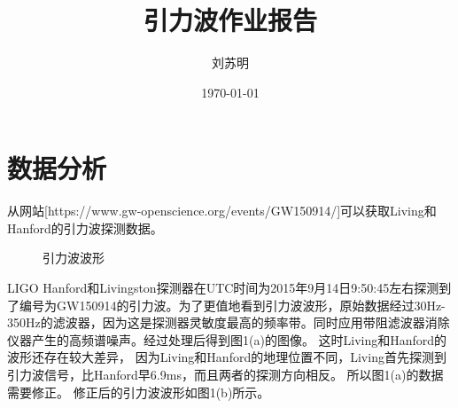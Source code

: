\documentclass[UTF8]{ctexart}
\title{\heiti 引力波作业报告}
\author{\kaishu 刘苏明}
\date{\today}
\begin{document}
\maketitle
\section{数据分析}
从网站[https://www.gw-openscience.org/events/GW150914/]可以获取Living和Hanford的引力波探测数据。
\begin{figure}[!htbp]
	\centering
	\caption{引力波波形}
\end{figure}

LIGO Hanford和Livingston探测器在UTC时间为2015年9月14日9:50:45左右探测到了编号为GW150914的引力波。为了更值地看到引力波波形，原始数据经过30Hz-350Hz的滤波器，因为这是探测器灵敏度最高的频率带。同时应用带阻滤波器消除仪器产生的高频谱噪声。经过处理后得到图1(a)的图像。 这时Living和Hanford的波形还存在较大差异， 因为Living和Hanford的地理位置不同，Living首先探测到引力波信号，比Hanford早6.9ms，而且两者的探测方向相反。 所以图1(a)的数据需要修正。 修正后的引力波波形如图1(b)所示。
\end{document}
